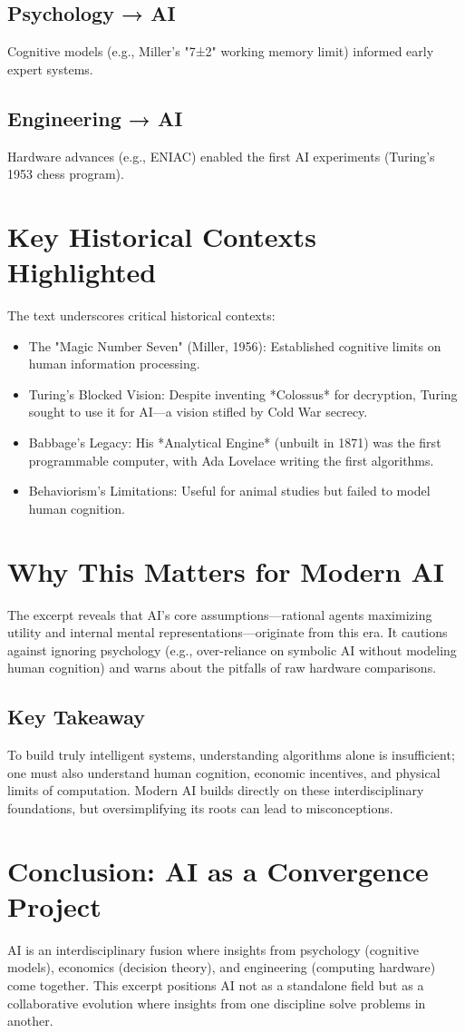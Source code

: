 \documentclass{article}
\begin{document}
\subsection{Psychology → AI}
Cognitive models (e.g., Miller’s "7±2" working memory limit) informed early expert systems.

\subsection{Engineering → AI}
Hardware advances (e.g., ENIAC) enabled the first AI experiments (Turing's 1953 chess program).

\section{Key Historical Contexts Highlighted}
The text underscores critical historical contexts:
\begin{itemize}
    \item The "Magic Number Seven" (Miller, 1956): Established cognitive limits on human information processing.
    \item Turing’s Blocked Vision: Despite inventing *Colossus* for decryption, Turing sought to use it for AI—a vision stifled by Cold War secrecy.
    \item Babbage’s Legacy: His *Analytical Engine* (unbuilt in 1871) was the first programmable computer, with Ada Lovelace writing the first algorithms.
    \item Behaviorism's Limitations: Useful for animal studies but failed to model human cognition.
\end{itemize}

\section{Why This Matters for Modern AI}
The excerpt reveals that AI’s core assumptions—rational agents maximizing utility and internal mental representations—originate from this era. It cautions against ignoring psychology (e.g., over-reliance on symbolic AI without modeling human cognition) and warns about the pitfalls of raw hardware comparisons.

\subsection{Key Takeaway}
To build truly intelligent systems, understanding algorithms alone is insufficient; one must also understand human cognition, economic incentives, and physical limits of computation. Modern AI builds directly on these interdisciplinary foundations, but oversimplifying its roots can lead to misconceptions.

\section{Conclusion: AI as a Convergence Project}
AI is an interdisciplinary fusion where insights from psychology (cognitive models), economics (decision theory), and engineering (computing hardware) come together. This excerpt positions AI not as a standalone field but as a collaborative evolution where insights from one discipline solve problems in another.
\end{document}
